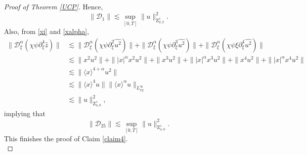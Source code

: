 \documentclass[reqno]{amsart}
\newcommand{\les}{\lesssim}
\newcommand{\lanx}{\langle x \rangle}
\newcommand{\Dta}{\mathcal{D}^{\alpha}_\xi}
\newcommand{\p}{\partial}
\numberwithin{equation}{section}
\begin{document}
\begin{proof}[Proof of Theorem \ref{UCP}]
Hence,
\begin{equation*}
\|\mathcal D_1\|\les \sup_{[0,T]}\|u\|_{\mathrm{Z}_{2,2}^s}^2.
\end{equation*}
Also, from \eqref{xi} and \eqref{xalpha},
\begin{equation*}
\begin{split}\label{29}
\|\Dta(\chi \psi \p_\xi^4 \hat z)\|&\les \|\Dta(\chi \psi \p_\xi^2 \widehat{ u^2})\|+\|\Dta(\chi \psi \p_\xi^3 \widehat{u^2})\|+\|\Dta(\chi \psi \xi \p_\xi^4 \widehat{u^2})\|\\
&\les \|x^2 u^2\|+\||x|^\alpha x^2 u^2\|+\|x^3 u^2\|+\||x|^\alpha x^3 u^2\|+\|x^4 u^2\|+\||x|^\alpha x^4 u^2\|\\
&\les \|\lanx^{4+\alpha}u^2\|\\
&\les\|\lanx^4 u\|\|\lanx^\alpha u\|_{L^\infty_{xy}}\\
&\les \|u\|_{\mathrm{Z}_{4,0}^s}^2,
\end{split}
\end{equation*}
implying that
\begin{equation*}
\|\mathcal D_{25}\|\les \sup_{[0,T]}\|u\|_{\mathrm{Z}_{4,0}^s}^2.
\end{equation*}
 This finishes the proof of Claim \ref{claim4}.\\



\end{proof}
\end{document}
